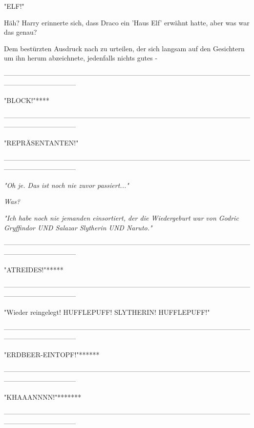 {\hfill\break "ELF!"

Häh? Harry erinnerte sich, dass Draco ein 'Haus Elf' erwähnt hatte, aber was war das genau?

Dem bestürzten Ausdruck nach zu urteilen, der sich langsam auf den Gesichtern um ihn herum abzeichnete, jedenfalls nichts gutes -

--------------------------------------------------------------------------------------------------------------------------------------------

\hfill\break "BLOCK!"****

--------------------------------------------------------------------------------------------------------------------------------------------

\hfill\break "REPRÄSENTANTEN!"

--------------------------------------------------------------------------------------------------------------------------------------------

\hfill\break \emph{"\emph{Oh je. Das ist noch nie zuvor passiert...}"}

\emph{\emph{Was?}}

\emph{"\emph{Ich habe noch nie jemanden einsortiert, der die Wiedergeburt}} \emph{\emph{war}} \emph{\emph{von Godric Gryffindor UND Salazar Slytherin UND Naruto.}"}

--------------------------------------------------------------------------------------------------------------------------------------------

\hfill\break "ATREIDES!"*****

--------------------------------------------------------------------------------------------------------------------------------------------

\hfill\break "Wieder reingelegt! HUFFLEPUFF! SLYTHERIN! HUFFLEPUFF!"

--------------------------------------------------------------------------------------------------------------------------------------------

\hfill\break "ERDBEER-EINTOPF!"******

--------------------------------------------------------------------------------------------------------------------------------------------

\hfill\break "KHAAANNNN!"*******

--------------------------------------------------------------------------------------------------------------------------------------------

}
